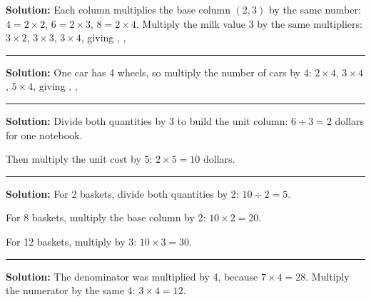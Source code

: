 \documentclass[12pt]{article}
\begin{document}



\textbf{Solution:} Each column multiplies the base column $(2, 3)$ by the same
number: $4 = 2 \times 2$, $6 = 2 \times 3$, $8 = 2 \times 4$. Multiply the milk
value 3 by the same multipliers: $3 \times 2$, $3 \times 3$, $3 \times 4$, giving
, , 

\vspace{0.3cm}\noindent\rule{\linewidth}{0.2pt}\vspace{0.3cm}


\textbf{Solution:} One car has 4 wheels, so multiply the number of cars by 4:
$2 \times 4$, $3 \times 4$, $5 \times 4$, giving , , 

\vspace{0.3cm}\noindent\rule{\linewidth}{0.2pt}\vspace{0.3cm}


\textbf{Solution:} Divide both quantities by 3 to build the unit column:
$6 \div 3 = 2$ dollars for one notebook. 

Then multiply the unit cost by 5: $2 \times 5 = 10$ dollars. 

\vspace{0.3cm}\noindent\rule{\linewidth}{0.2pt}\vspace{0.3cm}


\textbf{Solution:} For 2 baskets, divide both quantities by 2: $10 \div 2 = 5$.

For 8 baskets, multiply the base column by 2: $10 \times 2 = 20$. 

For 12 baskets, multiply by 3: $10 \times 3 = 30$. 

\vspace{0.3cm}\noindent\rule{\linewidth}{0.2pt}\vspace{0.3cm}


\textbf{Solution:} The denominator was multiplied by 4, because $7 \times 4 =
28$. Multiply the numerator by the same 4: $3 \times 4 = 12$. 
\end{document}
